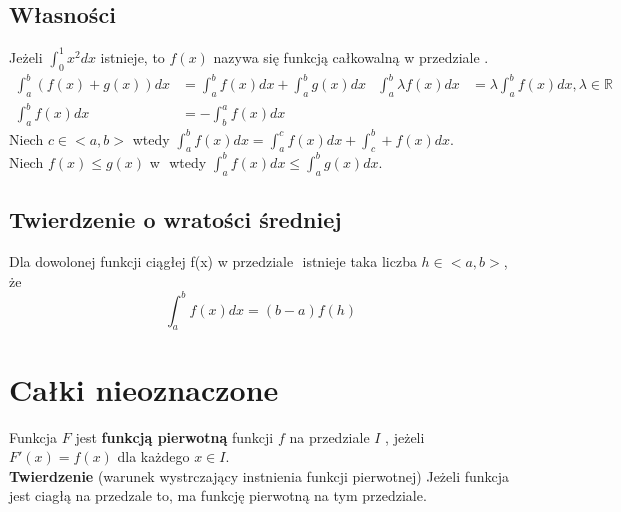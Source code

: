 \documentclass[11pt]{article}
\begin{document}
\subsection{Własności}
\label{sec:orgac6c7e3}
Jeżeli \(\int_{0}^{1} x^2 dx\) istnieje, to \(f(x)\) nazywa się funkcją całkowalną w przedziale \(<a,b>\).
\begin{align*}
  \int_{a}^{b}\left( f(x) + g(x) \right)dx &= \int_a^b f(x)dx + \int_a^b g(x)dx
  & \int_{a}^{b} \lambda f(x)dx &= \lambda \int_{a}^{b}f(x)dx, \lambda \in \mathbb{R}
\\ \int_a^b f(x)dx &= - \int_b^a f(x)dx
\end{align*}
Niech \(c \in <a,b>\) wtedy \(\int_a^b f(x)dx = \int_a^c f(x)dx + \int_c^b+f(x)dx\).\\\empty
Niech \(f(x) \le g(x)\) w \(<a, b>\) wtedy \(\int_a^b f(x)dx \le \int_a^b g(x)dx\).
\subsection{Twierdzenie o wratości średniej}
\label{sec:orgbe43564}
Dla dowolonej funkcji ciągłej f(x) w przedziale \(<a,b>\) istnieje taka liczba \(h \in <a,b>\), że
$$\int_a^b f(x)dx = (b-a)f(h)$$
\section{Całki nieoznaczone}
\label{sec:orgb53e5bd}
Funkcja \(F\) jest \textbf{funkcją pierwotną} funkcji \(f\) na przedziale \(I\) , jeżeli \(F'(x) = f(x)\) dla każdego \(x \in I\).
\\\empty
\textbf{Twierdzenie} (warunek wystrczający instnienia funkcji pierwotnej) Jeżeli funkcja jest ciagłą na przedzale to, ma funkcję pierwotną  na tym przedziale.
\end{document}

